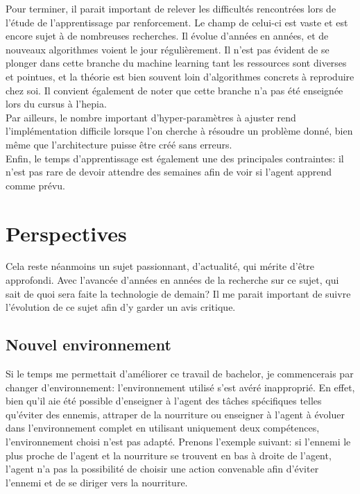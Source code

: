 \documentclass[11pt,a4paper]{report}
\begin{document}
  \par Pour terminer, il parait important de relever les difficultés rencontrées lors de l'étude de l'apprentissage par renforcement. Le champ de celui-ci est vaste et est encore sujet à de nombreuses recherches. Il évolue d'années en années, et de nouveaux algorithmes voient le jour régulièrement. Il n'est pas évident de se plonger dans cette branche du machine learning tant les ressources sont diverses et pointues, et la théorie est bien souvent loin d'algorithmes concrets à reproduire chez soi. Il convient également de noter que cette branche n'a pas été enseignée lors du cursus à l'hepia. \\
  Par ailleurs, le nombre important d'hyper-paramètres à ajuster rend l'implémentation difficile lorsque l'on cherche à résoudre un problème donné, bien même que l'architecture puisse être créé sans erreurs. \\
  Enfin, le temps d'apprentissage est également une des principales contraintes: il n'est pas rare de devoir attendre des semaines afin de voir si l'agent apprend comme prévu. 
  
  \section{Perspectives}
  
   \par Cela reste néanmoins un sujet passionnant, d'actualité, qui mérite d'être approfondi. Avec l'avancée d'années en années de la recherche sur ce sujet, qui sait de quoi sera faite la technologie de demain? Il me parait important de suivre l'évolution de ce sujet afin d'y garder un avis critique. 

  \subsection{Nouvel environnement}  
  
  \par Si le temps me permettait d'améliorer ce travail de bachelor, je commencerais par changer d'environnement: l'environnement utilisé s'est avéré inapproprié. En effet, bien qu'il aie été possible d'enseigner à l'agent des tâches spécifiques telles qu'éviter des ennemis, attraper de la nourriture ou enseigner à l'agent à évoluer dans l'environnement complet en utilisant uniquement deux compétences, l'environnement choisi n'est pas adapté. Prenons l'exemple suivant: si l'ennemi le plus proche de l'agent et la nourriture se trouvent en bas à droite de l'agent, l'agent n'a pas la possibilité de choisir une action convenable afin d'éviter l'ennemi et de se diriger vers la nourriture. 
\end{document}
